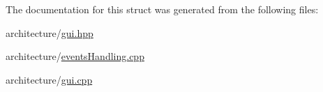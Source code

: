 The documentation for this struct was generated from the following files\+:\begin{DoxyCompactItemize}
\item 
architecture/\hyperlink{gui_8hpp}{gui.\+hpp}\item 
architecture/\hyperlink{events_handling_8cpp}{events\+Handling.\+cpp}\item 
architecture/\hyperlink{gui_8cpp}{gui.\+cpp}\end{DoxyCompactItemize}
